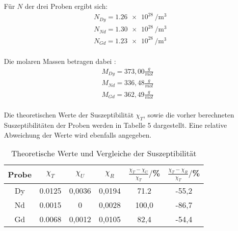 Für $N$ der drei Proben ergibt sich:
\begin{align*}
  &N_{Dy} = \SI{1.26e28}{\per\meter^3} \\ %
  &N_{Nd} = \SI{1.30e28}{\per\meter^3} \\ %
  &N_{Gd} = \SI{1.23e28}{\per\meter^3} \\ %
\end{align*}

Die molaren Massen betragen dabei \cite{sample1}:
\begin{align*}
  M_{Dy} = 373,00 \frac{g}{mol} \\
  M_{Nd} = 336,48 \frac{g}{mol} \\
  M_{Gd} = 362,49 \frac{g}{mol} \\
\end{align*}

Die theoretischen Werte der Suszeptibilität $\chi_T$, sowie die vorher berechneten Suszeptibilitäten
der Proben werden in Tabelle 5 dargestellt. Eine relative Abweichung der Werte wird ebenfalls angegeben.

\begin{table}[H]
  \centering
  \caption{Theoretische Werte und Vergleiche der Suszeptibilität}
  \label{tab:Dy}
  \begin{tabular}{c c c c c c}
    \toprule
    Probe & $\chi_T$ & $\chi_U$ & $\chi_R$ & $\frac{\chi_T - \chi_U}{\chi_T}/$\%  & $\frac{\chi_T - \chi_R}{\chi_T}/$\% \\
    \midrule
    Dy & 0.0125 & 0,0036 & 0,0194 & 71.2 & -55,2\\  %
    Nd & 0.0015 & 0 & 0,0028 & 100,0 & -86,7\\      %
    Gd & 0.0068 & 0,0012 &  0,0105 & 82,4 & -54,4\\   %
    \bottomrule
  \end{tabular}
\end{table}
